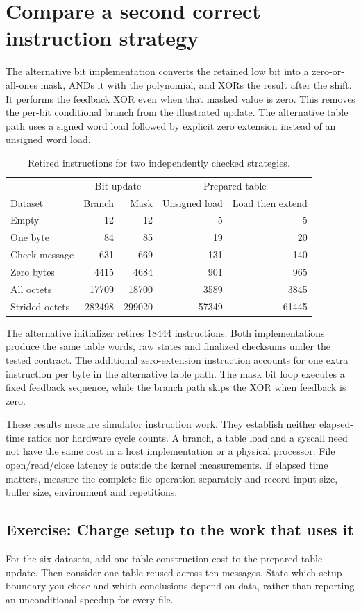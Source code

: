 \section{Compare a second correct instruction strategy}
The alternative bit implementation converts the retained low bit into a zero-or-all-ones
mask, ANDs it with the polynomial, and XORs the result after the shift. It performs the
feedback XOR even when that masked value is zero. This removes the per-bit conditional
branch from the illustrated update. The alternative table path uses a signed word load
followed by explicit zero extension instead of an unsigned word load.

\begin{table}[htbp]
\centering
\caption{Retired instructions for two independently checked strategies.}
\begin{tabular}{lrrrr}
\toprule
 & \multicolumn{2}{c}{Bit update} & \multicolumn{2}{c}{Prepared table}\\
Dataset & Branch & Mask & Unsigned load & Load then extend\\
\midrule
Empty & 12 & 12 & 5 & 5\\
One byte & 84 & 85 & 19 & 20\\
Check message & 631 & 669 & 131 & 140\\
Zero bytes & 4415 & 4684 & 901 & 965\\
All octets & 17709 & 18700 & 3589 & 3845\\
Strided octets & 282498 & 299020 & 57349 & 61445\\
\bottomrule
\end{tabular}
\end{table}

The alternative initializer retires 18444 instructions. Both implementations produce
the same table words, raw states and finalized checksums under the tested contract.
The additional zero-extension instruction accounts for one extra instruction per byte
in the alternative table path. The mask bit loop executes a fixed feedback sequence,
while the branch path skips the XOR when feedback is zero.

These results measure simulator instruction work. They establish neither elapsed-time
ratios nor hardware cycle counts. A branch, a table load and a syscall need not have
the same cost in a host implementation or a physical processor. File open/read/close
latency is outside the kernel measurements. If elapsed time matters, measure the complete
file operation separately and record input size, buffer size, environment and repetitions.

\subsection*{Exercise: Charge setup to the work that uses it}
For the six datasets, add one table-construction cost to the prepared-table update.
Then consider one table reused across ten messages. State which setup boundary you
chose and which conclusions depend on data, rather than reporting an unconditional
speedup for every file.
